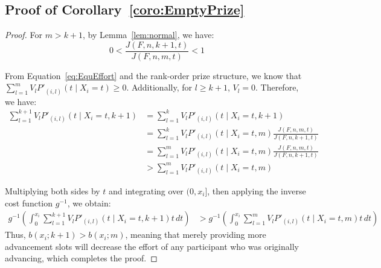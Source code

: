 \subsection*{Proof of Corollary~\ref{coro:EmptyPrize}}
\begin{proof}
    For \( m > k+1 \), by Lemma~\ref{lem:normal}, we have:
    \[
    0 < \frac{J(F,n,k+1,t)}{J(F,n,m,t)} < 1
    \]

    From Equation~\eqref{eq:EquEffort} and the rank-order prize structure, we know that \(\sum_{l=1}^{m} V_l P'_{(i,l)}(t \mid X_i = t) \geq 0\). Additionally, for \( l \geq k+1 \), \( V_l = 0 \). Therefore, we have:
    \begin{align*}
        \sum_{l=1}^{k+1} V_l P'_{(i,l)}(t \mid X_i = t, k+1) &= \sum_{l=1}^{k} V_l P'_{(i,l)}(t \mid X_i = t, k+1) \\
        &= \sum_{l=1}^{k} V_l P'_{(i,l)}(t \mid X_i = t, m) \frac{J(F,n,m,t)}{J(F,n,k+1,t)} \\
        &= \sum_{l=1}^{m} V_l P'_{(i,l)}(t \mid X_i = t, m) \frac{J(F,n,m,t)}{J(F,n,k+1,t)} \\
        &> \sum_{l=1}^{m} V_l P'_{(i,l)}(t \mid X_i = t, m)
    \end{align*}

    Multiplying both sides by \( t \) and integrating over \( (0, x_i] \), then applying the inverse cost function \( g^{-1} \), we obtain:
    \begin{align*}
        g^{-1}\left( \int_{0}^{x_i} \sum_{l=1}^{k+1} V_l P'_{(i,l)}(t \mid X_i = t, k+1)t \, dt \right) & > g^{-1}\left( \int_{0}^{x_i} \sum_{l=1}^{m} V_l P'_{(i,l)}(t \mid X_i = t, m)t \, dt \right)
    \end{align*}
    Thus, \( b(x_i; k+1) > b(x_i; m) \), meaning that merely providing more advancement slots will decrease the effort of any participant who was originally advancing, which completes the proof.
\end{proof}

